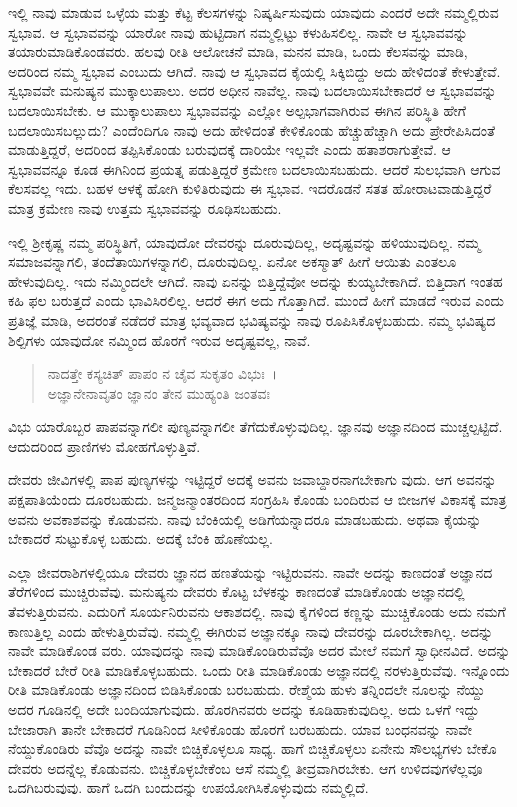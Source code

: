 ಇಲ್ಲಿ ನಾವು ಮಾಡುವ ಒಳ್ಳೆಯ ಮತ್ತು ಕೆಟ್ಟ ಕೆಲಸಗಳನ್ನು ನಿಷ್ಕರ್ಷಿಸುವುದು ಯಾವುದು ಎಂದರೆ ಅದೇ ನಮ್ಮಲ್ಲಿರುವ ಸ್ವಭಾವ. ಆ ಸ್ವಭಾವವನ್ನು ಯಾರೋ ನಾವು ಹುಟ್ಟಿದಾಗ ನಮ್ಮಲ್ಲಿಟ್ಟು ಕಳುಹಿಸಲಿಲ್ಲ. ನಾವೇ ಆ ಸ್ವಭಾವವನ್ನು ತಯಾರುಮಾಡಿಕೊಂಡವರು. ಹಲವು ರೀತಿ ಆಲೋಚನೆ ಮಾಡಿ, ಮನನ ಮಾಡಿ, ಒಂದು ಕೆಲಸವನ್ನು ಮಾಡಿ, ಅದರಿಂದ ನಮ್ಮ ಸ್ವಭಾವ ಎಂಬುದು ಆಗಿದೆ. ನಾವು ಆ ಸ್ವಭಾವದ ಕೈಯಲ್ಲಿ ಸಿಕ್ಕಿಬಿದ್ದು ಅದು ಹೇಳಿದಂತೆ ಕೇಳುತ್ತೇವೆ. ಸ್ವಭಾವವೇ ಮನುಷ್ಯನ ಮುಕ್ಕಾಲುಪಾಲು. ಅದರ ಅಧೀನ ನಾವೆಲ್ಲ. ನಾವು ಬದಲಾಯಿಸಬೇಕಾದರೆ ಆ ಸ್ವಭಾವವನ್ನು ಬದಲಾಯಿಸಬೇಕು. ಆ ಮುಕ್ಕಾಲುಪಾಲು ಸ್ವಭಾವವನ್ನು ಎಲ್ಲೋ ಅಲ್ಪಭಾಗವಾಗಿರುವ ಈಗಿನ ಪರಿಸ್ಥಿತಿ ಹೇಗೆ ಬದಲಾಯಿಸಬಲ್ಲುದು? ಎಂದೆಂದಿಗೂ ನಾವು ಅದು ಹೇಳಿದಂತೆ ಕೇಳಿಕೊಂಡು ಹೆಚ್ಚುಹೆಚ್ಚಾಗಿ ಅದು ಪ್ರೇರೇಪಿಸಿದಂತೆ ಮಾಡುತ್ತಿದ್ದರೆ, ಅದರಿಂದ ತಪ್ಪಿಸಿಕೊಂಡು ಬರುವುದಕ್ಕೆ ದಾರಿಯೇ ಇಲ್ಲವೇ ಎಂದು ಹತಾಶರಾಗುತ್ತೇವೆ. ಆ ಸ್ವಭಾವವನ್ನೂ ಕೂಡ ಈಗಿನಿಂದ ಪ್ರಯತ್ನ ಪಡುತ್ತಿದ್ದರೆ ಕ್ರಮೇಣ ಬದಲಾಯಿಸಬಹುದು. ಆದರೆ ಸುಲಭವಾಗಿ ಆಗುವ ಕೆಲಸವಲ್ಲ ಇದು. ಬಹಳ ಆಳಕ್ಕೆ ಹೋಗಿ ಕುಳಿತಿರುವುದು ಈ ಸ್ವಭಾವ. ಇದರೊಡನೆ ಸತತ ಹೋರಾಟವಾಡುತ್ತಿದ್ದರೆ ಮಾತ್ರ ಕ್ರಮೇಣ ನಾವು ಉತ್ತಮ ಸ್ವಭಾವವನ್ನು ರೂಢಿಸಬಹುದು.

ಇಲ್ಲಿ ಶ‍್ರೀಕೃಷ್ಣ ನಮ್ಮ ಪರಿಸ್ಥಿತಿಗೆ, ಯಾವುದೋ ದೇವರನ್ನು ದೂರುವುದಿಲ್ಲ, ಅದೃಷ್ಟವನ್ನು ಹಳಿಯುವುದಿಲ್ಲ. ನಮ್ಮ ಸಮಾಜವನ್ನಾಗಲಿ, ತಂದೆತಾಯಿಗಳನ್ನಾಗಲಿ, ದೂರುವುದಿಲ್ಲ. ಏನೋ ಅಕಸ್ಮಾತ್ ಹೀಗೆ ಆಯಿತು ಎಂತಲೂ ಹೇಳುವುದಿಲ್ಲ. ಇದು ನಮ್ಮಿಂದಲೇ ಆಗಿದೆ. ನಾವು ಏನನ್ನು ಬಿತ್ತಿದ್ದೆವೋ ಅದನ್ನು ಕುಯ್ಯಬೇಕಾಗಿದೆ. ಬಿತ್ತಿದಾಗ ಇಂತಹ ಕಹಿ ಫಲ ಬರುತ್ತದೆ ಎಂದು ಭಾವಿಸಿರಲಿಲ್ಲ. ಆದರೆ ಈಗ ಅದು ಗೊತ್ತಾಗಿದೆ. ಮುಂದೆ ಹೀಗೆ ಮಾಡದೆ ಇರುವ ಎಂದು ಪ್ರತಿಜ್ಞೆ ಮಾಡಿ, ಅದರಂತೆ ನಡೆದರೆ ಮಾತ್ರ ಭವ್ಯವಾದ ಭವಿಷ್ಯವನ್ನು ನಾವು ರೂಪಿಸಿಕೊಳ್ಳಬಹುದು. ನಮ್ಮ ಭವಿಷ್ಯದ ಶಿಲ್ಪಿಗಳು ಯಾವುದೋ ನಮ್ಮಿಂದ ಹೊರಗೆ ಇರುವ ಅದೃಷ್ಟವಲ್ಲ, ನಾವೆ.

\begin{verse}
ನಾದತ್ತೇ ಕಸ್ಯಚಿತ್ ಪಾಪಂ ನ ಚೈವ ಸುಕೃತಂ ವಿಭುಃ~।\\ಅಜ್ಞಾನೇನಾವೃತಂ ಜ್ಞಾನಂ ತೇನ ಮುಹ್ಯಂತಿ ಜಂತವಃ 
\end{verse}

{\small ವಿಭು ಯಾರೊಬ್ಬರ ಪಾಪವನ್ನಾಗಲೀ ಪುಣ್ಯವನ್ನಾಗಲೀ ತೆಗೆದುಕೊಳ್ಳುವುದಿಲ್ಲ. ಜ್ಞಾನವು ಅಜ್ಞಾನದಿಂದ ಮುಚ್ಚಲ್ಪಟ್ಟಿದೆ. ಆದುದರಿಂದ ಪ್ರಾಣಿಗಳು ಮೋಹಗೊಳ್ಳುತ್ತಿವೆ.}

ದೇವರು ಜೀವಿಗಳಲ್ಲಿ ಪಾಪ ಪುಣ್ಯಗಳನ್ನು ಇಟ್ಟಿದ್ದರೆ ಅದಕ್ಕೆ ಅವನು ಜವಾಬ್ದಾರನಾಗಬೇಕಾಗು ವುದು. ಆಗ ಅವನನ್ನು ಪಕ್ಷಪಾತಿಯೆಂದು ದೂರಬಹುದು. ಜನ್ಮಜನ್ಮಾಂತರದಿಂದ ಸಂಗ್ರಹಿಸಿ ಕೊಂಡು ಬಂದಿರುವ ಆ ಬೀಜಗಳ ವಿಕಾಸಕ್ಕೆ ಮಾತ್ರ ಅವನು ಅವಕಾಶವನ್ನು ಕೊಡುವನು. ನಾವು ಬೆಂಕಿಯಲ್ಲಿ ಅಡಿಗೆಯನ್ನಾದರೂ ಮಾಡಬಹುದು. ಅಥವಾ ಕೈಯನ್ನು ಬೇಕಾದರೆ ಸುಟ್ಟುಕೊಳ್ಳ ಬಹುದು. ಅದಕ್ಕೆ ಬೆಂಕಿ ಹೊಣೆಯಲ್ಲ.

ಎಲ್ಲಾ ಜೀವರಾಶಿಗಳಲ್ಲಿಯೂ ದೇವರು ಜ್ಞಾನದ ಹಣತೆಯನ್ನು ಇಟ್ಟಿರುವನು. ನಾವೇ ಅದನ್ನು ಕಾಣದಂತೆ ಅಜ್ಞಾನದ ತೆರೆಗಳಿಂದ ಮುಚ್ಚಿರುವೆವು. ಮನುಷ್ಯನು ದೇವರು ಕೊಟ್ಟ ಬೆಳಕನ್ನು ಕಾಣದಂತೆ ಮಾಡಿಕೊಂಡು ಅಜ್ಞಾನದಲ್ಲಿ ತೆವಳುತ್ತಿರುವನು. ಎದುರಿಗೆ ಸೂರ್ಯನಿರುವನು ಆಕಾಶದಲ್ಲಿ. ನಾವು ಕೈಗಳಿಂದ ಕಣ್ಣನ್ನು ಮುಚ್ಚಿಕೊಂಡು ಅದು ನಮಗೆ ಕಾಣುತ್ತಿಲ್ಲ ಎಂದು ಹೇಳುತ್ತಿರುವೆವು. ನಮ್ಮಲ್ಲಿ ಈಗಿರುವ ಅಜ್ಞಾನಕ್ಕೂ ನಾವು ದೇವರನ್ನು ದೂರಬೇಕಾಗಿಲ್ಲ. ಅದನ್ನು ನಾವೇ ಮಾಡಿಕೊಂಡ ವರು. ಯಾವುದನ್ನು ನಾವು ಮಾಡಿಕೊಂಡಿರುವೆವೊ ಅದರ ಮೇಲೆ ನಮಗೆ ಸ್ವಾಧೀನವಿದೆ. ಅದನ್ನು ಬೇಕಾದರೆ ಬೇರೆ ರೀತಿ ಮಾಡಿಕೊಳ್ಳಬಹುದು. ಒಂದು ರೀತಿ ಮಾಡಿಕೊಂಡು ಅಜ್ಞಾನದಲ್ಲಿ ನರಳುತ್ತಿರುವೆವು. ಇನ್ನೊಂದು ರೀತಿ ಮಾಡಿಕೊಂಡು ಅಜ್ಞಾನದಿಂದ ಬಿಡಿಸಿಕೊಂಡು ಬರಬಹುದು. ರೇಶ್ಮೆಯ ಹುಳು ತನ್ನಿಂದಲೇ ನೂಲನ್ನು ನೆಯ್ದು ಅದರ ಗೂಡಿನಲ್ಲಿ ಅದೇ ಬಂದಿಯಾಗುವುದು. ಹೊರಗಿನವರು ಅದನ್ನು ಕೂಡಿಹಾಕುವುದಿಲ್ಲ. ಅದು ಒಳಗೆ ಇದ್ದು ಬೇಜಾರಾಗಿ ತಾನೇ ಬೇಕಾದರೆ ಗೂಡಿನಿಂದ ಸೀಳಿಕೊಂಡು ಹೊರಗೆ ಬರಬಹುದು. ಯಾವ ಬಂಧನವನ್ನು ನಾವೇ ನೆಯ್ದುಕೊಂಡಿರು ವೆವೊ ಅದನ್ನು ನಾವೇ ಬಿಚ್ಚಿಕೊಳ್ಳಲೂ ಸಾಧ್ಯ. ಹಾಗೆ ಬಿಚ್ಚಿಕೊಳ್ಳಲು ಏನೇನು ಸೌಲಭ್ಯಗಳು ಬೇಕೊ ದೇವರು ಅದನ್ನೆಲ್ಲ ಕೊಡುವನು. ಬಿಚ್ಚಿಕೊಳ್ಳಬೇಕೆಂಬ ಆಸೆ ನಮ್ಮಲ್ಲಿ ತೀವ್ರವಾಗಿರಬೇಕು. ಆಗ ಉಳಿದವುಗಳೆಲ್ಲವೂ ಒದಗಿಬರುವುವು. ಹಾಗೆ ಒದಗಿ ಬಂದುದನ್ನು ಉಪಯೋಗಿಸಿಕೊಳ್ಳುವುದು ನಮ್ಮಲ್ಲಿದೆ.

